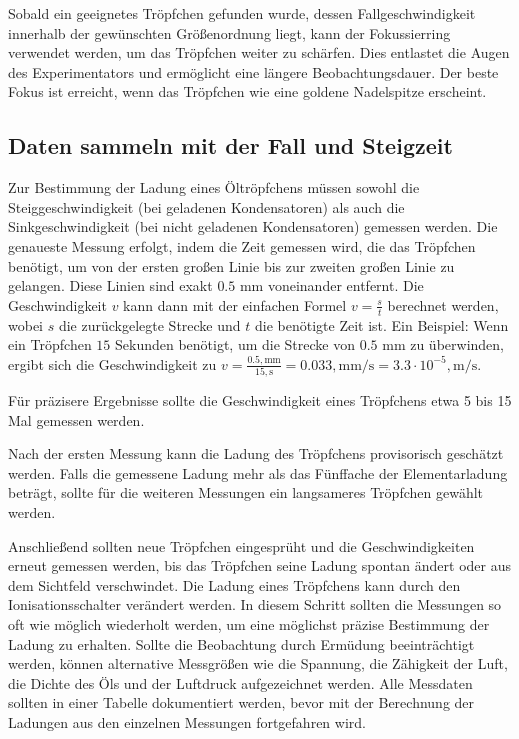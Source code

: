 Sobald ein geeignetes Tröpfchen gefunden wurde, dessen Fallgeschwindigkeit innerhalb der gewünschten Größenordnung liegt, kann der Fokussierring verwendet werden, um das Tröpfchen weiter zu schärfen. Dies entlastet die Augen des Experimentators und ermöglicht eine längere Beobachtungsdauer. Der beste Fokus ist erreicht, wenn das Tröpfchen wie eine goldene Nadelspitze erscheint.

\subsection{Daten sammeln mit der Fall und Steigzeit}\label{sub:datenFallundSteig}
Zur Bestimmung der Ladung eines Öltröpfchens müssen sowohl die Steiggeschwindigkeit (bei geladenen Kondensatoren) als auch die Sinkgeschwindigkeit (bei nicht geladenen Kondensatoren) gemessen werden. Die genaueste Messung erfolgt, indem die Zeit gemessen wird, die das Tröpfchen benötigt, um von der ersten großen Linie bis zur zweiten großen Linie zu gelangen. Diese Linien sind exakt $0.5$ mm voneinander entfernt. Die Geschwindigkeit $v$ kann dann mit der einfachen Formel $v = \frac{s}{t}$ berechnet werden, wobei $s$ die zurückgelegte Strecke und $t$ die benötigte Zeit ist. Ein Beispiel: Wenn ein Tröpfchen $15$ Sekunden benötigt, um die Strecke von $0.5$ mm zu überwinden, ergibt sich die Geschwindigkeit zu $v = \frac{0.5,\text{mm}}{15,\text{s}} = 0.033,\text{mm/s} = 3.3 \cdot 10^{-5},\text{m/s}$.

Für präzisere Ergebnisse sollte die Geschwindigkeit eines Tröpfchens etwa 5 bis 15 Mal gemessen werden.

Nach der ersten Messung kann die Ladung des Tröpfchens provisorisch geschätzt werden. Falls die gemessene Ladung mehr als das Fünffache der Elementarladung beträgt, sollte für die weiteren Messungen ein langsameres Tröpfchen gewählt werden.

Anschließend sollten neue Tröpfchen eingesprüht und die Geschwindigkeiten erneut gemessen werden, bis das Tröpfchen seine Ladung spontan ändert oder aus dem Sichtfeld verschwindet. Die Ladung eines Tröpfchens kann durch den Ionisationsschalter verändert werden. In diesem Schritt sollten die Messungen so oft wie möglich wiederholt werden, um eine möglichst präzise Bestimmung der Ladung zu erhalten. Sollte die Beobachtung durch Ermüdung beeinträchtigt werden, können alternative Messgrößen wie die Spannung, die Zähigkeit der Luft, die Dichte des Öls und der Luftdruck aufgezeichnet werden. Alle Messdaten sollten in einer Tabelle dokumentiert werden, bevor mit der Berechnung der Ladungen aus den einzelnen Messungen fortgefahren wird.

